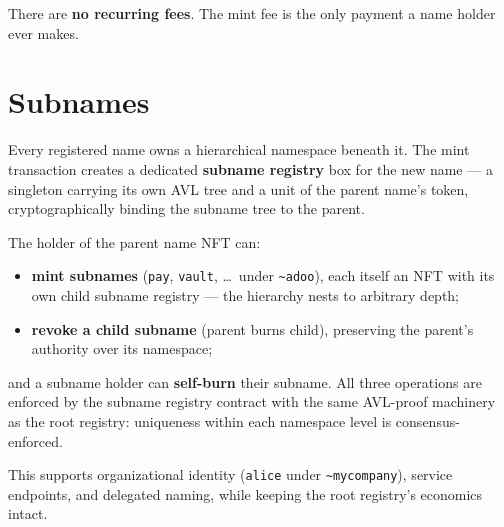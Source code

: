 \documentclass[11pt]{article}
\newcommand{\name}[1]{\texttt{\textasciitilde#1}}
\newcommand{\code}[1]{\texttt{#1}}
\begin{document}
There are \textbf{no recurring fees}. The mint fee is the only payment a name
holder ever makes.

\section{Subnames}
\label{sec:subnames}

Every registered name owns a hierarchical namespace beneath it. The mint
transaction creates a dedicated \textbf{subname registry} box for the new
name --- a singleton carrying its own AVL tree and a unit of the parent
name's token, cryptographically binding the subname tree to the parent.

The holder of the parent name NFT can:

\begin{itemize}
  \item \textbf{mint subnames} (\code{pay}, \code{vault}, \ldots\ under
        \name{adoo}), each itself an NFT with its own child subname registry
        --- the hierarchy nests to arbitrary depth;
  \item \textbf{revoke a child subname} (parent burns child), preserving the
        parent's authority over its namespace;
\end{itemize}

and a subname holder can \textbf{self-burn} their subname. All three
operations are enforced by the subname registry contract with the same
AVL-proof machinery as the root registry: uniqueness within each namespace
level is consensus-enforced.

This supports organizational identity (\code{alice} under \name{mycompany}),
service endpoints, and delegated naming, while keeping the root registry's
economics intact.
\end{document}
